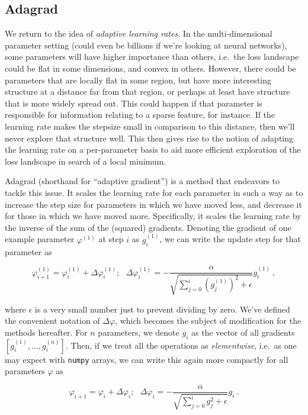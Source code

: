 \documentclass[
  11pt,
  numbers=noendperiod]{book}
\begin{document}
\hypertarget{adagrad}{%
\subsection{Adagrad}\label{adagrad}}

We return to the idea of \emph{adaptive learning rates}. In the
multi-dimensional parameter setting (could even be billions if we're
looking at neural networks), some parameters will have higher importance
than others, i.e.~the loss landscape could be flat in some dimensions,
and convex in others. However, there could be parameters that are
locally flat in some region, but have more interesting structure at a
distance far from that region, or perhaps at least have structure that
is more widely spread out. This could happen if that parameter is
responsible for information relating to a sparse feature, for instance.
If the learning rate makes the stepsize small in comparison to this
distance, then we'll never explore that structure well. This then gives
rise to the notion of adapting the learning rate on a per-parameter
basis to aid more efficient exploration of the loss landscape in search
of a local minimum.

Adagrad (shorthand for ``adaptive gradient'') is a method that endeavors
to tackle this issue. It scales the learning rate for each parameter in
such a way as to increase the step size for parameters in which we have
moved less, and decrease it for those in which we have moved more.
Specifically, it scales the learning rate by the inverse of the sum of
the (squared) gradients. Denoting the gradient of one example parameter
\(\varphi^{(1)}\) at step \(i\) as \(g^{(1)}_{i}\), we can write the
update step for that parameter as

\[
\varphi^{(1)}_{i+1} = \varphi^{(1)}_{i} + \Delta\varphi_i^{(1)};~~~ \Delta\varphi_{i}^{(1)} = - \frac{\alpha}{\sqrt{\sum^{i}_{j=0}\left(g^{(1)}_{j}\right)^2 + \epsilon}} g^{(1)}_{i} ~,
\]

where \(\epsilon\) is a very small number just to prevent dividing by
zero. We've defined the convenient notation of \(\Delta\varphi\), which
becomes the subject of modification for the methods hereafter. For \(n\)
parameters, we denote \(g_{i}\) as the vector of all gradients
\([g^{(1)}_{i}, \dots, g^{(n)}_{i}]\). Then, if we treat all the
operations as \emph{elementwise}, i.e.~as one may expect with
\texttt{numpy} arrays, we can write this again more compactly for all
parameters \(\varphi\) as

\[
\varphi_{i+1} = \varphi_{i} + \Delta \varphi_i ;~~~ \Delta\varphi_i = - \frac{\alpha}{\sqrt{\sum^{i}_{j=0}g^2_{j} + \epsilon}} g_{i} ~.
\]
\end{document}
